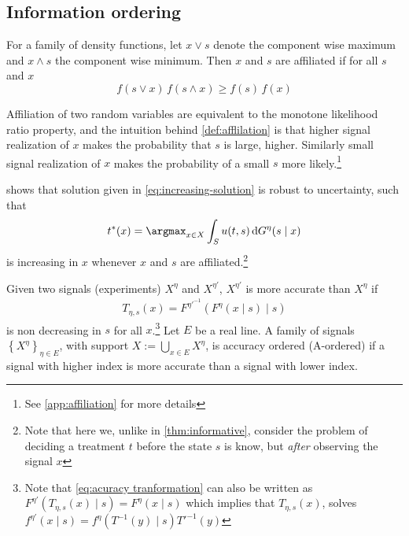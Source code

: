 
\subsection{Information ordering}

\begin{definition}\label{def:afflilation} \parencite{Milgrom1982a}
For a family of density functions, let \(x\lor s\) denote the component wise maximum and \(x\land s\) the component wise minimum. Then \(x\) and \(s\) are affiliated if for all \(s\) and \(x\)
\[
	f(s\lor x)\, f(s\land x)\ge f(s)\, f(x)
\]
\end{definition}

Affiliation of two random variables are equivalent to the monotone likelihood ratio property, and the intuition behind \cref{def:afflilation} is that higher signal realization of \(x\) makes the probability that \(s\) is large, higher. Similarly small signal realization of \(x\) makes the probability of a small \(s\) more likely.\footnote{See \cref{app:affiliation} for more details}

\textcite{Athey2002}  shows that solution given in \cref{eq:increasing-solution} is robust to uncertainty, such that
\[
	t^*(x)=\argmax_{x\in X}\int_Su(t,s)\dif G^\eta(s\mid x)
\]
is increasing in \(x\)  whenever \(x\) and \(s\) are affiliated.\footnote{Note that here we, unlike in \cref{thm:informative}, consider the problem of deciding a treatment \(t\) before the state \(s\) is know, but \emph{after} observing the signal \(x\) }

\begin{definition}\label{def:accuracy}
\parencite{Persico2000} Given two signals (experiments) \(X^{\eta}\) and \(X^{\eta'}\),  \(X^{\eta'}\) is more accurate than \(X^{\eta}\) if
\begin{align}
    	T_{\eta,s}(x)=F^{\eta'^{-1}}(F^{\eta}(x\mid s)\mid s)\label{eq:acuracy tranformation}
\end{align}
is non decreasing in \(s\) for all \(x\).\footnote{Note that \cref{eq:acuracy tranformation} can also be written as \(F^{\eta'}(T_{\eta,s}(x)\mid s)=F^{\eta}(x\mid s)\) which implies that \(T_{\eta,s}(x)\), solves \(f^{\eta'}(x\mid s)=f^\eta(T^{-1}(y)\mid s)T'^{-1}(y)\)} Let \(E\) be a real line. A family of signals \(\left \{ X^{\eta}\right \} _{\eta\in E}\), with support \(X:=\bigcup_{x\in E}X^\eta\), is accuracy ordered (A-ordered) if a signal with higher index is more accurate than a signal with lower index.
\end{definition}


